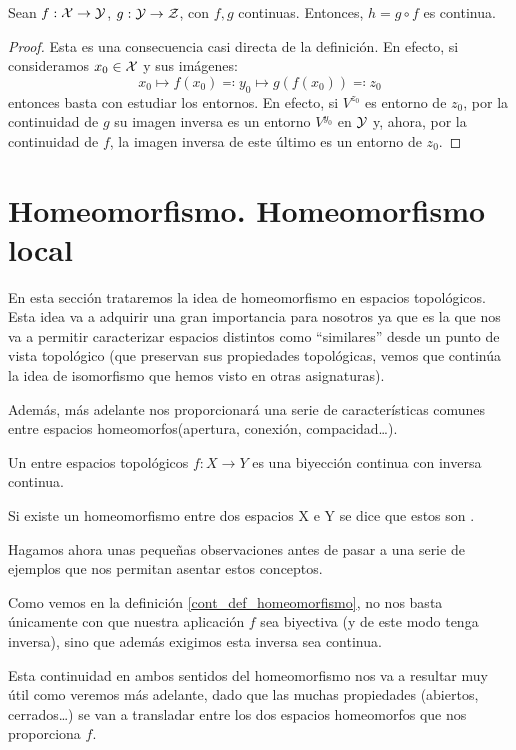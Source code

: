 \begin{prop}
	Sean $f:\mathcal{X}\to\mathcal{Y}$, $g:\mathcal{Y}\to\mathcal{Z}$, con $f,g$ continuas. Entonces, $h = g\circ f$ es continua.
	
	\begin{proof}
		Esta es una consecuencia casi directa de la definición. En efecto, si consideramos $x_0\in\mathcal{X}$ y sus imágenes:
		\[x_0\mapsto f(x_0)\eqqcolon y_0\mapsto g(f(x_0))\eqqcolon z_0\]
		entonces basta con estudiar los entornos. En efecto, si $V^{z_0}$ es entorno de $z_0$, por la continuidad de $g$ su imagen inversa es un entorno $V^{y_0}$ en $\mathcal{Y}$ y, ahora, por la continuidad de $f$, la imagen inversa de este último es un entorno de $z_0$.
	\end{proof}
\end{prop}

\section{Homeomorfismo. Homeomorfismo local}
\label{cont_homeomorfismos}
En esta sección trataremos la idea de homeomorfismo en espacios topológicos. Esta idea va a adquirir una gran importancia para nosotros ya que es la que nos va a permitir caracterizar espacios distintos como ``similares'' desde un punto de vista topológico (que preservan sus propiedades topológicas, vemos que continúa la idea de isomorfismo que hemos visto en otras asignaturas).


Además, más adelante nos proporcionará una serie de características comunes entre espacios homeomorfos(apertura, conexión, compacidad\dots).

\label{cont_def_homeomorfismo}

\begin{defi}[Homeomorfismo]
	Un  entre espacios topológicos $f\colon X\rightarrow Y$ es una biyección continua con inversa continua.
	
	Si existe un homeomorfismo entre dos espacios X e Y se dice que estos son .
\end{defi}

Hagamos ahora unas pequeñas observaciones antes de pasar a una serie de ejemplos que nos permitan asentar estos conceptos.

\label{cont_obs_defHomeomorfismo}
\begin{obs}
	Como vemos en la definición \ref{cont_def_homeomorfismo}, no nos basta únicamente con que nuestra aplicación $f$ sea biyectiva (y de este modo tenga inversa), sino que además exigimos esta inversa sea continua. 
	
	Esta continuidad en ambos sentidos del homeomorfismo nos va a resultar muy útil como veremos más adelante, dado que las muchas propiedades (abiertos, cerrados\dots) se van a transladar entre los dos espacios homeomorfos que nos proporciona $f$.
\end{obs}

